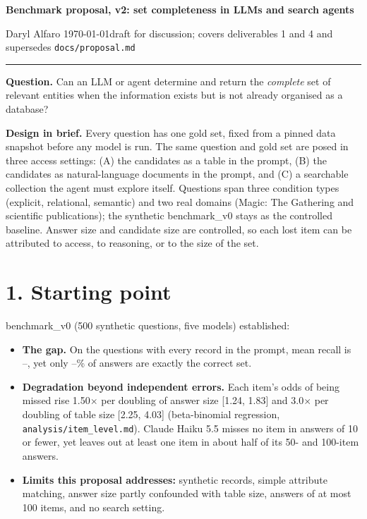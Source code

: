 \documentclass[10pt]{article}
\begin{document}
{\Large\textbf{Benchmark proposal, v2: set completeness in LLMs and search agents}}\par
\vspace{2pt}
Daryl Alfaro \quad\textbullet\quad \today \quad\textbullet\quad draft for discussion; covers deliverables 1 and 4
and supersedes \texttt{docs/proposal.md}\par
\vspace{-2pt}\rule{\linewidth}{0.4pt}

\textbf{Question.} Can an LLM or agent determine and return the \emph{complete} set of relevant entities when the
information exists but is not already organised as a database?

\textbf{Design in brief.} Every question has one gold set, fixed from a pinned data snapshot before any model is
run. The same question and gold set are posed in three access settings: (A) the candidates as a table in the
prompt, (B) the candidates as natural-language documents in the prompt, and (C) a searchable collection the agent
must explore itself. Questions span three condition types (explicit, relational, semantic) and two real domains
(Magic: The Gathering and scientific publications); the synthetic benchmark\_v0 stays as the controlled baseline.
Answer size and candidate size are controlled, so each lost item can be attributed to access, to reasoning, or to
the size of the set.

\section*{1. Starting point}
benchmark\_v0 (500 synthetic questions, five models) established:
\begin{itemize}
\item \textbf{The gap.} On the \nctx{} questions with every record in the prompt, mean recall is
\recallmin--\recallmax, yet only \exactmin--\exactmax\% of answers are exactly the correct set.
\item \textbf{Degradation beyond independent errors.} Each item's odds of being missed rise 1.50$\times$ per
doubling of answer size [1.24, 1.83] and 3.0$\times$ per doubling of table size [2.25, 4.03] (beta-binomial
regression, \texttt{analysis/item\_level.md}). Claude Haiku 5.5 misses no item in answers of 10 or fewer, yet
leaves out at least one item in about half of its 50- and 100-item answers.
\item \textbf{Limits this proposal addresses:} synthetic records, simple attribute matching, answer size partly
confounded with table size, answers of at most 100 items, and no search setting.
\end{itemize}
\end{document}
